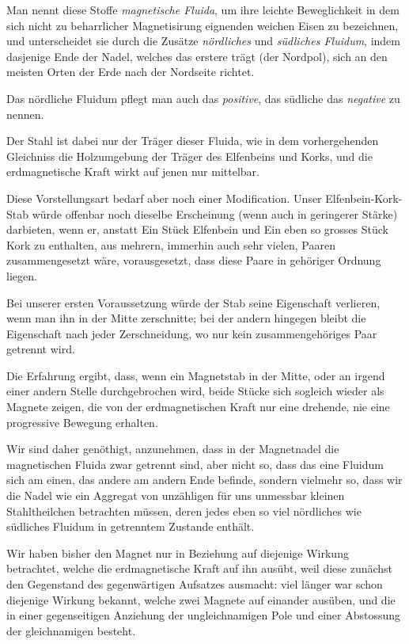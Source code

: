 \documentclass[12pt,a4paper]{article}
\begin{document}
Man nennt diese Stoffe \textit{magnetische Fluida}, um ihre leichte Beweglichkeit in dem sich nicht zu beharrlicher Magnetisirung eignenden weichen Eisen zu bezeichnen, und unterscheidet sie durch die Zusätze \textit{nördliches} und \textit{südliches Fluidum}, indem dasjenige Ende der Nadel, welches das erstere trägt (der Nordpol), sich an den meisten Orten der Erde nach der Nordseite richtet.

Das nördliche Fluidum pflegt man auch das \textit{positive}, das südliche das \textit{negative} zu nennen.

Der Stahl ist dabei nur der Träger dieser Fluida, wie in dem vorhergehenden Gleichniss die Holzumgebung der Träger des Elfenbeins und Korks, und die erdmagnetische Kraft wirkt auf jenen nur mittelbar.

Diese Vorstellungsart bedarf aber noch einer Modification. Unser Elfenbein-Kork-Stab würde offenbar noch dieselbe Erscheinung (wenn auch in geringerer Stärke) darbieten, wenn er, anstatt Ein Stück Elfenbein und Ein eben so grosses Stück Kork zu enthalten, aus mehrern, immerhin auch sehr vielen, Paaren zusammengesetzt wäre, vorausgesetzt, dass diese Paare in gehöriger Ordnung liegen.

Bei unserer ersten Voraussetzung würde der Stab seine Eigenschaft verlieren, wenn man ihn in der Mitte zerschnitte; bei der andern hingegen bleibt die Eigenschaft nach jeder Zerschneidung, wo nur kein zusammengehöriges Paar getrennt wird.

Die Erfahrung ergibt, dass, wenn ein Magnetstab in der Mitte, oder an irgend einer andern Stelle durchgebrochen wird, beide Stücke sich sogleich wieder als Magnete zeigen, die von der erdmagnetischen Kraft nur eine drehende, nie eine progressive Bewegung erhalten.

Wir sind daher genöthigt, anzunehmen, dass in der Magnetnadel die magnetischen Fluida zwar getrennt sind, aber nicht so, dass das eine Fluidum sich am einen, das andere am andern Ende befinde, sondern vielmehr so, dass wir die Nadel wie ein Aggregat von unzähligen für uns unmessbar kleinen Stahltheilchen betrachten müssen, deren jedes eben so viel nördliches wie südliches Fluidum in getrenntem Zustande enthält.

\bigskip

Wir haben bisher den Magnet nur in Beziehung auf diejenige Wirkung betrachtet, welche die erdmagnetische Kraft auf ihn ausübt, weil diese zunächst den Gegenstand des gegenwärtigen Aufsatzes ausmacht: viel länger war schon diejenige Wirkung bekannt, welche zwei Magnete auf einander ausüben, und die in einer gegenseitigen Anziehung der ungleichnamigen Pole und einer Abstossung der gleichnamigen besteht.
\end{document}

